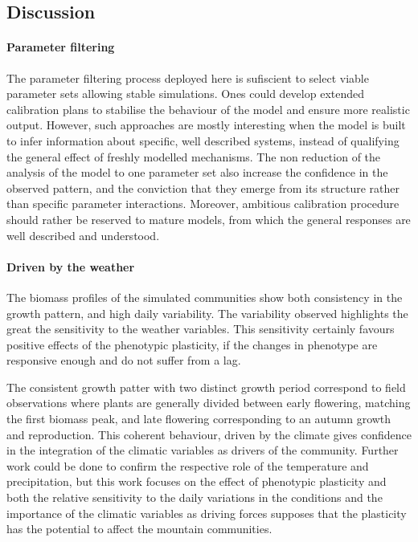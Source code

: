 \subsection{Discussion}

\paragraph{Parameter filtering}

The parameter filtering process deployed here is sufiscient to select viable parameter sets allowing stable simulations. Ones could develop extended calibration plans to stabilise the behaviour of the model and ensure more realistic output. However, such approaches are mostly interesting when the model is built to infer information about specific, well described systems, instead of qualifying the general effect of freshly modelled mechanisms. The non reduction of the analysis of the model to one parameter set also increase the confidence in the observed pattern, and the conviction that they emerge from its structure rather than specific parameter interactions. Moreover, ambitious calibration procedure should rather be reserved to mature models, from which the general responses are well described and understood.

\paragraph{Driven by the weather}

The biomass profiles of the simulated communities show both consistency in the growth pattern, and high daily variability. The variability observed highlights the great the sensitivity to the weather variables. This sensitivity certainly favours positive effects of the phenotypic plasticity, if the changes in phenotype are responsive enough and do not suffer from a lag.

The consistent growth patter with two distinct growth period correspond to field observations where plants are generally divided between early flowering, matching the first biomass peak, and late flowering corresponding to an autumn growth and reproduction. This coherent behaviour, driven by the climate gives confidence in the integration of the climatic variables as drivers of the community. Further work could be done to confirm the respective role of the temperature and precipitation, but this work focuses on the effect of phenotypic plasticity and both the relative sensitivity to the daily variations in the conditions and the importance of the climatic variables as driving forces supposes that the plasticity has the potential to affect the mountain communities.

